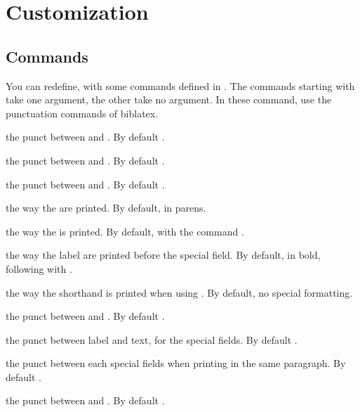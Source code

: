 \documentclass{ltxdockit}[2011/03/25]
\newcommand{\biblatex}{biblatex\xspace}
\begin{document}
\section{Customization}

\subsection{Commands}

You can redefine, with  some commands defined in . The commands starting with  take one argument, the other take no argument. In these command, use the punctuation commands of \biblatex.

\begin{ltxsyntax}
 the punct between  and . By default .

 the punct between  and . By default .

 the punct between  and . By default .

 the way the  are printed. By default, in parens.

 the way the  is printed. By default, with the command .

 the way the label are printed before the special field. By default, in bold, following with .

 the way the shorthand is printed when using . By default, no special formatting.

 the punct between  and .  By default .

 the punct between label and text, for the special fields. By default .

 the punct between each special fields when printing in the same paragraph. By default .

 the punct between  and . By default .
\end{ltxsyntax}
\end{document}
